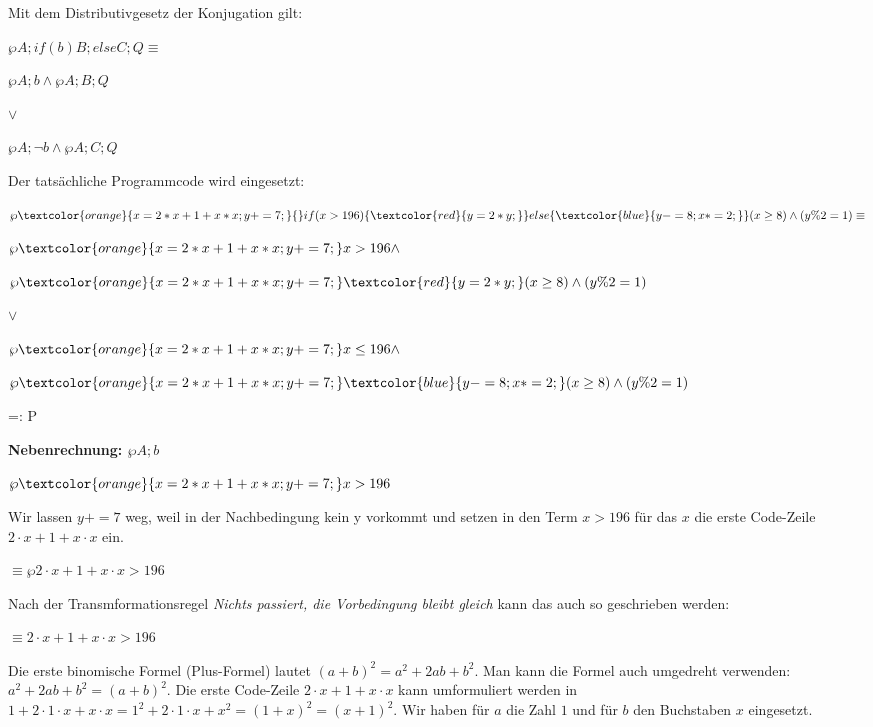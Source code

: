 \documentclass{lehramt-informatik-haupt}
\def\MatheEnv#1{
  \medskip

  \hspace{2em}#1

  \medskip
}
\def\Mathe#1{
  \MatheEnv{$#1$}
}
\def\MatheEquiv#1{
  \MatheEnv{$\equiv$\hspace{2em}$#1$}
}
\def\Erklaerung#1{
  \medskip
  {\footnotesize#1}
}
\begin{document}
\begin{antwort}
\setlength{\parindent}{0pt}

\def\code#1{„\texttt{#1}“}
\def\FarbeA#1{\textcolor{orange}{#1}}
\def\FarbeB#1{\textcolor{red}{#1}}
\def\FarbeC#1{\textcolor{blue}{#1}}

\def\NebenRechnung#1{\medskip\bigskip\par\textbf{Nebenrechnung: #1}\par\medskip}

\def\AnweisungI{x=2*x+1+x*x;}
\def\AnweisungII{y+=7;}
\def\AnweisungIII{y=2*y;}
\def\AnweisungIV{y-=8;}
\def\AnweisungV{x*=2;}

\def\A{\FarbeA{\AnweisungI\AnweisungII}}
\def\B{\FarbeB{\AnweisungIII}}
\def\C{\FarbeC{\AnweisungIV\AnweisungV}}
\def\Q{(x \geq 8) \land (y \% 2 = 1)}

Mit dem Distributivgesetz der Konjugation gilt: \bigskip

$\wp{A; if(b) B; else C;}{Q} \equiv$

$\wp{A;}{b} \land \wp{A;B;}{Q}$

$\lor$%

$\wp{A;}{\neg b} \land \wp{A;C;}{Q}$

\bigskip Der tatsächliche Programmcode wird eingesetzt:\bigskip

$\wp{\A{}if(x>196)\{\B\}else\{\C\}}{\Q} \equiv$

$\wp{\A}{x > 196} \land$

$\wp{\A\B}{\Q}$

%
$\lor$

$\wp{\A}{x \leq 196} \land$

$\wp{\A\C}{\Q}$

=: P

%

\NebenRechnung{$\wp{A;}{b}$}

\Mathe{
  \wp{\A}{x > 196}
}

\Erklaerung{Wir lassen $y+=7$ weg, weil in der Nachbedingung kein y
vorkommt und setzen in den Term $x > 196$ für das $x$ die erste
Code-Zeile $2 \cdot x + 1 + x \cdot x$ ein.}

\MatheEquiv{
  \wp{}{2 \cdot x + 1 + x \cdot x > 196}
}

\Erklaerung{Nach der Transmformationsregel \textit{Nichts passiert, die
Vorbedingung bleibt gleich} kann das auch so geschrieben werden:}

\MatheEquiv{
  2 \cdot x + 1 + x \cdot x > 196
}

\Erklaerung{Die erste binomische Formel (Plus-Formel) lautet
$(a + b)^2 = a^2 + 2ab + b^2$.
Man kann die Formel auch umgedreht verwenden:
$a^2 + 2ab + b^2 = (a + b)^2$.
Die erste Code-Zeile $2 \cdot x + 1 + x \cdot x$
kann umformuliert werden in
$
1 + 2 \cdot 1 \cdot x + x \cdot x =
1^2 + 2 \cdot 1 \cdot x + x^2 =
(1 + x)^2 =
(x + 1)^2
$.
Wir haben für $a$ die Zahl $1$ und für $b$ den Buchstaben $x$
eingesetzt.}


\end{antwort}
\end{document}

